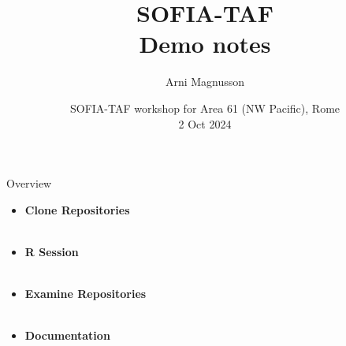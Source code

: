 \documentclass[aspectratio=169]{beamer}
\begin{document}
\begin{frame}
  \title{SOFIA-TAF\\[1ex]
    {\large\darkgreen Demo notes}}
  \author{\vspace{-4ex}
    Arni Magnusson}
  \date{SOFIA-TAF workshop for Area 61 (NW Pacific), Rome\\[0.2ex]
    2 Oct 2024}
  \titlepage
\end{frame}


\begin{frame}{Overview}
  \begin{itemize}
    \item[] {\bf\darkblue Clone Repositories}\\[0.1ex]
    \\[3ex]
    \item[] {\bf\darkblue R Session}\\[0.1ex]
    \\[3ex]
    \item[] {\bf\darkblue Examine Repositories}\\[0.1ex]
    \\[3ex]
    \item[] {\bf\darkblue Documentation}\\[0.1ex]
  \end{itemize}
\end{frame}

\end{document}
